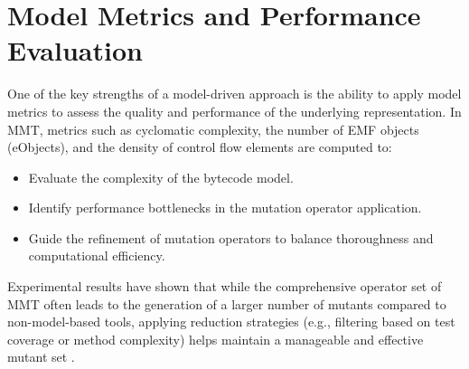 \documentclass[sigplan, nonacm]{acmart}
\begin{document}
\section{Model Metrics and Performance Evaluation}
\label{sec:metrics}
One of the key strengths of a model-driven approach is the ability to apply model metrics to assess the quality and performance of the underlying representation. In MMT, metrics such as cyclomatic complexity, the number of EMF objects (eObjects), and the density of control flow elements are computed to:
\begin{itemize}[noitemsep]
	\item Evaluate the complexity of the bytecode model.
	\item Identify performance bottlenecks in the mutation operator application.
	\item Guide the refinement of mutation operators to balance thoroughness and computational efficiency.
\end{itemize}
Experimental results have shown that while the comprehensive operator set of MMT often leads to the generation of a larger number of mutants compared to non-model-based tools, applying reduction strategies (e.g., filtering based on test coverage or method complexity) helps maintain a manageable and effective mutant set \cite{Bockisch2024demonstration}.
\end{document}
